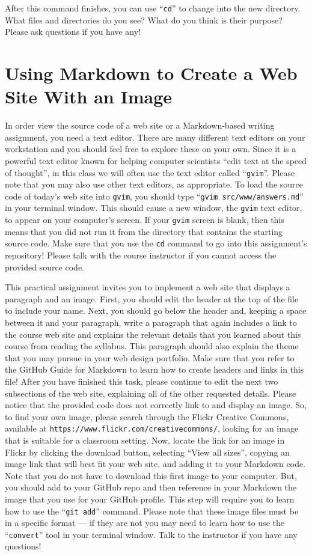 \documentclass[11pt]{article}
\newcommand{\gitadd}{\command{git add}}
\newcommand{\command}[1]{``\lstinline{#1}''}
\newcommand{\program}[1]{\lstinline{#1}} \newcommand{\url}[1]{\lstinline{#1}}
\begin{document}
After this command finishes, you can use \command{cd} to change into the new
directory. What files and directories do you see? What do you think is their
purpose? Please ask questions if you have any!

\section*{Using Markdown to Create a Web Site With an Image}

In order view the source code of a web site or a Markdown-based writing
assignment, you need a text editor. There are many different text editors on
your workstation and you should feel free to explore these on your own. Since it
is a powerful text editor known for helping computer scientists ``edit text at
the speed of thought'', in this class we will often use the text editor called
\command{gvim}. Please note that you may also use other text editors, as
appropriate. To load the source code of today's web site into \program{gvim},
you should type \command{gvim src/www/answers.md} in your terminal window. This
should cause a new window, the \program{gvim} text editor, to appear on your
computer's screen. If your \program{gvim} screen is blank, then this means that
you did not run it from the directory that contains the starting source code.
Make sure that you use the \program{cd} command to go into this assignment's
repository! Please talk with the course instructor if you cannot access the
provided source code.

This practical assignment invites you to implement a web site that displays a
paragraph and an image. First, you should edit the header at the top of the file
to include your name. Next, you should go below the header and, keeping a space
between it and your paragraph, write a paragraph that again includes a link to
the course web site and explains the relevant details that you learned about
this course from reading the syllabus. This paragraph should also explain the
theme that you may pursue in your web design portfolio.
%
Make sure that you refer to the GitHub Guide for Markdown to learn how to create
headers and links in this file!
%
After you have finished this task, please continue to edit the next two
subsections of the web site, explaining all of the other requested details.
Please notice that the provided code does not correctly link to and display an
image. So, to find your own image, please search through the Flickr Creative
Commons, available at \url{https://www.flickr.com/creativecommons/}, looking for
an image that is suitable for a classroom setting.
%
Now, locate the link for an image in Flickr by clicking the download button,
selecting ``View all sizes'', copying an image link that will best fit your web
site, and adding it to your Markdown code. Note that you do not have to download
this first image to your computer. But, you should add to your GitHub repo and
then reference in your Markdown the image that you use for your GitHub profile.
%
This step will require you to learn how to use the \gitadd{} command.
%
Please note that these image files must be in a specific format --- if they are
not you may need to learn how to use the \command{convert} tool in your
terminal window. Talk to the instructor if you have any questions!
\end{document}
